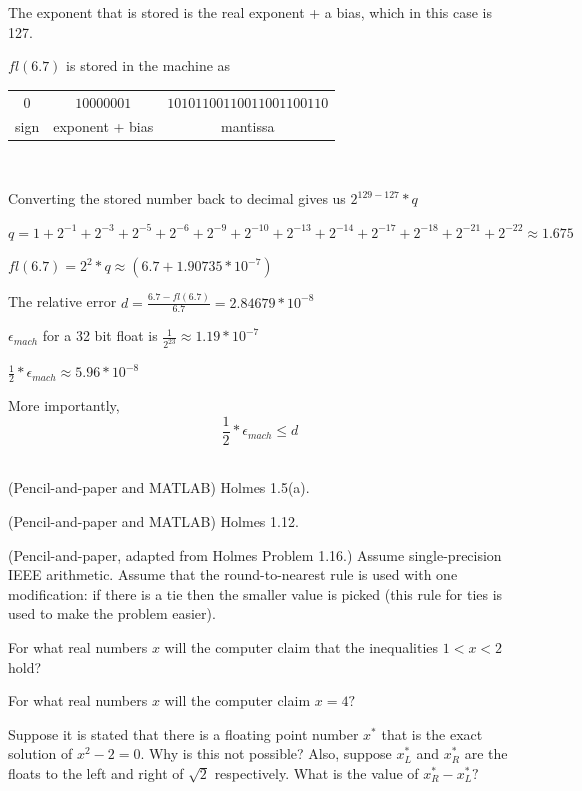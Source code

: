 	The exponent that is stored is the real exponent + a bias, which in this case is 127.

	$fl(6.7)$ is stored in the machine as

	\begin{center}
	\begin{tabular}{c | c | c}

		$0$ & $10000001$ & $10101100110011001100110$ \\

		sign & exponent + bias & mantissa \\

	\end{tabular} \\
\end{center}

	Converting the stored number back to decimal gives us $2^{129-127} * q$

	$q = 1 + 2^{-1} + 2^{-3} + 2^{-5} + 2^{-6} + 2^{-9} + 2^{-10} + 2^{-13} + 2^{-14} + 2^{-17} + 2^{-18}+2^{-21} + 2^{-22} \approx 1.675$

	$fl(6.7) = 2^2 * q  \approx (6.7+1.90735*10^{-7})$

	The relative error $d = \frac{6.7-fl(6.7)}{6.7} = 2.84679*10^{-8}$

	$\epsilon_{mach}$ for a 32 bit float is $\frac{1}{2^{23}} \approx 1.19*10^{-7}$

	$\frac{1}{2} * \epsilon_{mach} \approx 5.96 * 10^{-8}$

	More importantly, $$\frac{1}{2} * \epsilon_{mach} \leq d$$ \\

\item (Pencil-and-paper and MATLAB)
Holmes 1.5(a).

\item (Pencil-and-paper and MATLAB)
Holmes 1.12.

\item
(Pencil-and-paper, adapted from Holmes Problem 1.16.)  Assume single-precision IEEE arithmetic. Assume that the round-to-nearest rule is used with one modification: if there is a tie then the smaller value is picked (this rule for ties is used to make the problem easier).
\benum
\item For what real numbers $x$ will the computer claim that the inequalities $1 < x < 2$ hold?
\item For what real numbers $x$ will the computer claim $x = 4?$
\item Suppose it is stated that there is a floating point number $x^*$ that is the exact solution of
$x^2-2=0.$   Why is this not possible? Also, suppose $x^*_L$ and $x^*_R$ are the floats to the left and right of $\sqrt 2$ respectively.  What is the value of $x^*_R-x^*_L?$
\eenum

